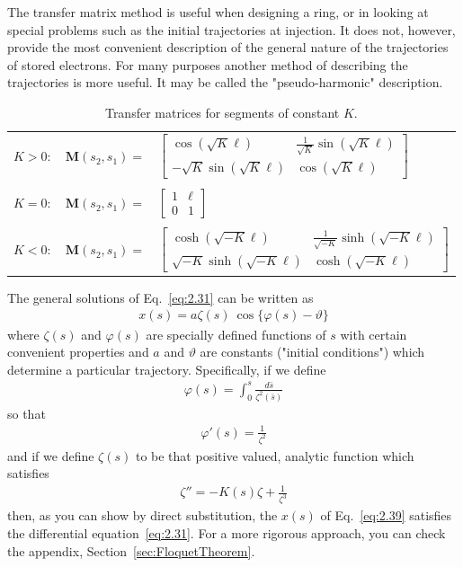 The transfer matrix method is useful when designing a ring, or in looking at special problems such as the initial trajectories at injection. It does not, however, provide the most convenient description of the general nature of the trajectories of stored electrons. For many purposes another method of describing the trajectories is more useful. It may be called the "pseudo-harmonic" description.
\begin{table}[!ht]
	\caption{Transfer matrices for segments of constant $K$.}
	\centering
	\begin{tabular}{lrl}
		$K>0:$ & $\boldsymbol{M}(s_2,s_1) =$ &  $\begin{bmatrix}
			\cos(\sqrt{K}\ell) & \frac{1}{\sqrt{K}}\sin(\sqrt{K}\ell)\\
			-\sqrt{K}\sin(\sqrt{K}\ell) & \cos(\sqrt{K}\ell)
			\end{bmatrix}$\\
		\\
		$K=0$: & $\boldsymbol{M}(s_2,s_1) =$ & $\begin{bmatrix}
			1 & \ell\\
			0 & 1
			\end{bmatrix}$\\
		\\
		$K<0:$ & $\boldsymbol{M}(s_2,s_1) =$ & $\begin{bmatrix}
				\cosh(\sqrt{-K}\ell) & \frac{1}{\sqrt{-K}}\sinh(\sqrt{-K}\ell)\\
				\sqrt{-K}\sinh(\sqrt{-K}\ell) & \cosh(\sqrt{-K}\ell)
				\end{bmatrix}$
	\end{tabular}
	\label{tab:tab1}
\end{table}

The general solutions of Eq.~\eqref{eq:2.31} can be written as
\begin{align}
	x(s) = a\zeta(s)\ \cos\{\varphi(s)-\vartheta\}\label{eq:2.39}
\end{align}
where $\zeta(s)$ and $\varphi(s)$ are specially defined functions of $s$ with certain convenient properties and $a$ and $\vartheta$ are constants ("initial conditions") which determine a particular trajectory. Specifically, if we define
\begin{align}
	\varphi(s) = \int_{0}^{s} \frac{d\bar{s}}{\zeta^2(\bar{s})}
\end{align}
so that
\begin{align}
	\varphi'(s) = \frac{1}{\zeta^2}
\end{align}
and if we define $\zeta(s)$ to be that positive valued, analytic function which satisfies
\begin{align}
	\zeta'' = -K(s)\zeta+\frac{1}{\zeta^3}\label{eq:2.42}
\end{align}
then, as you can show by direct substitution, the $x(s)$ of Eq.~\eqref{eq:2.39} satisfies the differential equation~\eqref{eq:2.31}. For a more rigorous approach, you can check the appendix, Section~\ref{sec:FloquetTheorem}.

